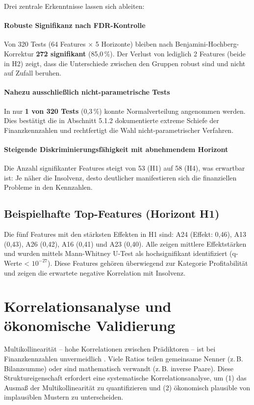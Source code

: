 Drei zentrale Erkenntnisse lassen sich ableiten:

\paragraph{Robuste Signifikanz nach FDR-Kontrolle} Von 320 Tests (64 Features × 5 Horizonte) bleiben nach Benjamini-Hochberg-Korrektur \textbf{272 signifikant} (85,0\,\%). Der Verlust von lediglich 2 Features (beide in H2) zeigt, dass die Unterschiede zwischen den Gruppen robust sind und nicht auf Zufall beruhen.

\paragraph{Nahezu ausschließlich nicht-parametrische Tests} In nur \textbf{1 von 320 Tests} (0,3\,\%) konnte Normalverteilung angenommen werden. Dies bestätigt die in Abschnitt 5.1.2 dokumentierte extreme Schiefe der Finanzkennzahlen und rechtfertigt die Wahl nicht-parametrischer Verfahren.

\paragraph{Steigende Diskriminierungsfähigkeit mit abnehmendem Horizont} Die Anzahl signifikanter Features steigt von 53 (H1) auf 58 (H4), was erwartbar ist: Je näher die Insolvenz, desto deutlicher manifestieren sich die finanziellen Probleme in den Kennzahlen.

\subsection{Beispielhafte Top-Features (Horizont H1)}

Die fünf Features mit den stärksten Effekten in H1 sind: A24 (Effekt: 0,46), A13 (0,43), A26 (0,42), A16 (0,41) und A23 (0,40). Alle zeigen mittlere Effektstärken und wurden mittels Mann-Whitney U-Test als hochsignifikant identifiziert (q-Werte < $10^{-27}$). Diese Features gehören überwiegend zur Kategorie Profitabilität und zeigen die erwartete negative Korrelation mit Insolvenz.

\section{Korrelationsanalyse und ökonomische Validierung}

Multikollinearität – hohe Korrelationen zwischen Prädiktoren – ist bei Finanzkennzahlen unvermeidlich \parencite{altman1968financial}. Viele Ratios teilen gemeinsame Nenner (z.\,B. Bilanzsumme) oder sind mathematisch verwandt (z.\,B. inverse Paare). Diese Struktureigenschaft erfordert eine systematische Korrelationsanalyse, um (1) das Ausmaß der Multikollinearität zu quantifizieren und (2) ökonomisch plausible von implausiblen Mustern zu unterscheiden.

